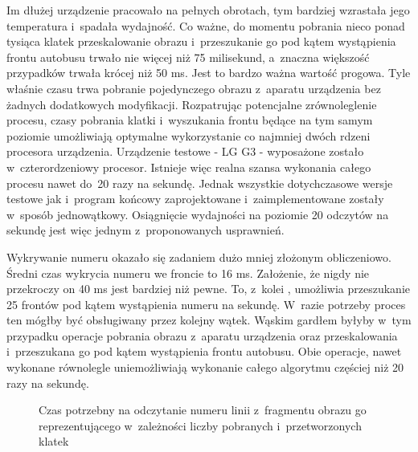 Im dłużej urządzenie pracowało na pełnych obrotach, tym bardziej wzrastała jego 
temperatura i~spadała wydajność. Co ważne, do momentu pobrania
nieco ponad tysiąca klatek przeskalowanie obrazu i~przeszukanie go
pod kątem wystąpienia frontu autobusu trwało nie więcej niż 75 milisekund,
a~znaczna większość przypadków trwała krócej niż 50 ms. Jest to bardzo 
ważna wartość progowa. Tyle właśnie czasu trwa pobranie pojedynczego
obrazu z~aparatu urządzenia bez żadnych dodatkowych modyfikacji.
Rozpatrując potencjalne zrównoleglenie procesu, czasy
pobrania klatki i~wyszukania frontu będące na tym samym poziomie 
umożliwiają optymalne wykorzystanie co najmniej dwóch rdzeni procesora urządzenia. 
Urządzenie testowe - LG G3 - wyposażone zostało w~czterordzeniowy procesor. Istnieje 
więc realna szansa wykonania całego procesu nawet do~20 razy na sekundę. 
Jednak wszystkie dotychczasowe wersje testowe jak i~program końcowy zaprojektowane i~zaimplementowane
zostały w~sposób jednowątkowy. Osiągnięcie wydajności na poziomie 20 odczytów na
sekundę jest więc jednym z~proponowanych usprawnień.

Wykrywanie numeru okazało się zadaniem dużo mniej złożonym obliczeniowo.
Średni czas wykrycia numeru we froncie to 16 ms. Założenie, że nigdy nie
przekroczy on 40 ms jest bardziej niż pewne.
To, z~kolei ,
umożliwia przeszukanie 25 frontów pod kątem wystąpienia numeru na sekundę.
W~razie potrzeby proces ten mógłby być obsługiwany przez kolejny wątek.
Wąskim gardłem byłyby w~tym przypadku operacje pobrania obrazu 
z~aparatu urządzenia oraz przeskalowania i~przeszukana go pod kątem wystąpienia 
frontu autobusu. Obie operacje, nawet wykonane równolegle uniemożliwiają 
wykonanie całego algorytmu częściej niż 20 razy na sekundę.

\begin{figure}[h!]
	\begin{center}
	\end{center}
	\caption{Czas potrzebny na odczytanie numeru linii z~fragmentu
		obrazu go reprezentującego w~zależności liczby pobranych 
		i~przetworzonych
		klatek}
	\label{chart:digits_ms_time}
\end{figure}

